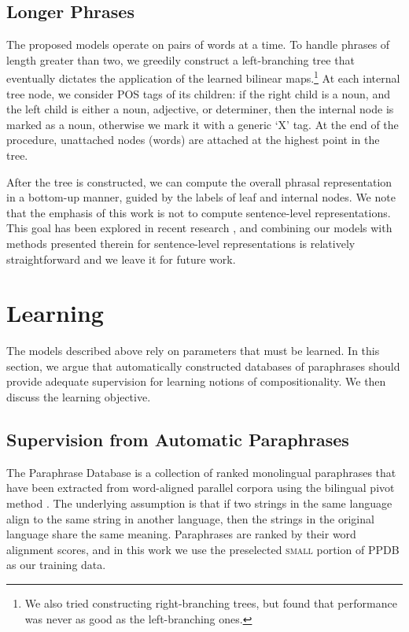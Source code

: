 \documentclass[11pt,letterpaper]{article}
\begin{document}
\subsection{Longer Phrases}
\label{sec:longer-phrases}

The proposed models operate on pairs of words at a time. 
To handle phrases of length greater than two, we greedily construct a left-branching tree that eventually dictates the application of the learned bilinear maps.\footnote{We also tried constructing right-branching trees, but found that performance was never as good as the left-branching ones.}
At each internal tree node, we consider POS tags of its children: if the right child is a noun, and the left child is either a noun, adjective, or determiner, then the internal node is marked as a noun, otherwise we mark it with a generic `X' tag. 
At the end of the procedure, unattached nodes (words) are attached at the highest point in the tree. 

After the tree is constructed, we can compute the overall phrasal representation in a bottom-up manner, guided by the labels of leaf and internal nodes.
We note that the emphasis of this work is not to compute sentence-level representations. 
This goal has been explored in recent research \cite{Le2014,Kalchbrenner2014}, and combining our models with methods presented therein for sentence-level representations is relatively straightforward and we leave it for future work. 

\section{Learning}
\label{sec:regularization}
The models described above rely on parameters that must be learned. In this section, we argue that automatically constructed databases of paraphrases should provide adequate supervision for learning notions of compositionality. We then discuss the learning objective.

\subsection{Supervision from Automatic Paraphrases}
\label{sec:ppdb}

The Paraphrase Database \cite[PPDB]{Ganitkevich2013} is a collection of ranked monolingual paraphrases that have been extracted from word-aligned parallel corpora using the bilingual pivot method \cite{Bannard2005}. 
The underlying assumption is that if two strings in the same language align to the same string in another language, then the strings in the original language share the same meaning. 
Paraphrases are ranked by their word alignment scores, and in this work we use the preselected \textsc{small} portion of PPDB as our training data.%
\end{document}
